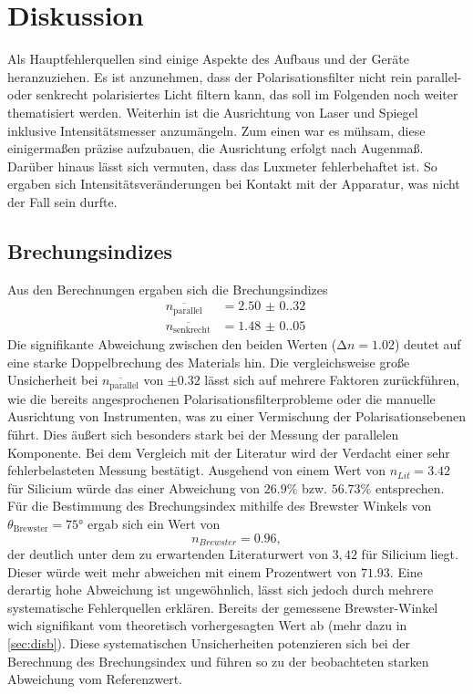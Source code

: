\section{Diskussion}
\label{sec:Diskussion}

Als Hauptfehlerquellen sind einige Aspekte des Aufbaus und der Geräte heranzuziehen.
Es ist anzunehmen, dass der Polarisationsfilter nicht rein parallel- oder 
senkrecht polarisiertes Licht filtern kann, das soll im Folgenden noch weiter 
thematisiert werden. Weiterhin ist die Ausrichtung von Laser und Spiegel inklusive 
Intensitätsmesser anzumängeln. Zum einen war es mühsam, diese einigermaßen präzise 
aufzubauen, die Ausrichtung erfolgt nach Augenmaß. Darüber hinaus lässt sich 
vermuten, dass das Luxmeter fehlerbehaftet ist. So ergaben sich 
Intensitätsveränderungen bei Kontakt mit der Apparatur, was nicht der Fall sein 
durfte.

\subsection{Brechungsindizes}
Aus den Berechnungen ergaben sich die Brechungsindizes
\begin{align*}
    \overline{n_\text{parallel}}  &= \qty{2.50(0.32)}{} \\
    \overline{n_\text{senkrecht}} &= \qty{1.48(0.05)}{}
\end{align*}
\noindent Die signifikante Abweichung zwischen den
beiden Werten ($\increment n = 1.02$) deutet auf eine starke Doppelbrechung des
Materials hin. Die vergleichsweise große Unsicherheit bei $\overline{n_\text{parallel}}$
von $\pm 0.32$ lässt sich auf mehrere Faktoren zurückführen, wie die bereits 
angesprochenen Polarisationsfilterprobleme oder die manuelle Ausrichtung von 
Instrumenten, was zu einer Vermischung der Polarisationsebenen führt.
Dies äußert sich besonders stark bei der Messung der parallelen Komponente.
Bei dem Vergleich mit der Literatur wird der Verdacht einer sehr fehlerbelasteten 
Messung bestätigt. Ausgehend von einem Wert von $n_{Lit} = 3.42$ \cite{brisi} 
für Silicium würde das einer Abweichung von $26.9 \%$ bzw. $56.73 \%$ entsprechen. 
Für die Bestimmung des Brechungsindex mithilfe des Brewster Winkels von 
$\theta_\text{Brewster}=75\unit{\degree}$ ergab sich ein Wert von 
\begin{equation*}
    n_{Brewster} = 0.96,
\end{equation*}
der deutlich unter dem zu erwartenden Literaturwert von $3,42$ für Silicium liegt.
Dieser würde weit mehr abweichen mit einem Prozentwert 
von $71.93$. Eine derartig hohe Abweichung ist ungewöhnlich, lässt sich jedoch
durch mehrere systematische Fehlerquellen erklären. Bereits der gemessene
Brewster-Winkel wich signifikant vom theoretisch vorhergesagten Wert ab (mehr 
dazu in \autoref{sec:disb}). Diese systematischen Unsicherheiten potenzieren sich
bei der Berechnung des Brechungsindex und führen so zu der beobachteten starken
Abweichung vom Referenzwert.

